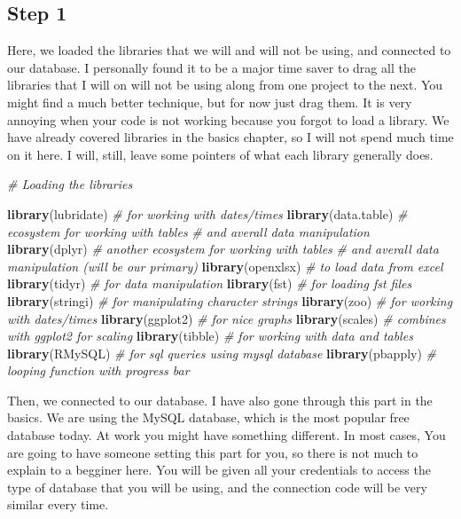 \documentclass[]{book}
\newenvironment{Shaded}{\begin{snugshade}}{\end{snugshade}}
\newcommand{\CommentTok}[1]{\textcolor[rgb]{0.56,0.35,0.01}{\textit{#1}}}
\newcommand{\KeywordTok}[1]{\textcolor[rgb]{0.13,0.29,0.53}{\textbf{#1}}}
\newcommand{\NormalTok}[1]{#1}
\begin{document}
\hypertarget{step-1-1}{%
\subsection{Step 1}\label{step-1-1}}

Here, we loaded the libraries that we will and will not be using, and connected to our database. I personally found it to be a major time saver to drag all the libraries that I will on will not be using along from one project to the next. You might find a much better technique, but for now just drag them. It is very annoying when your code is not working because you forgot to load a library. We have already covered libraries in the basics chapter, so I will not spend much time on it here. I will, still, leave some pointers of what each library generally does.

\begin{Shaded}
\begin{Highlighting}[]
\CommentTok{# Loading the libraries}

  \KeywordTok{library}\NormalTok{(lubridate) }\CommentTok{# for working with dates/times}
  \KeywordTok{library}\NormalTok{(data.table) }\CommentTok{# ecosystem for working with tables}
\CommentTok{# and averall data manipulation}
  \KeywordTok{library}\NormalTok{(dplyr) }\CommentTok{# another ecosystem for working with tables}
\CommentTok{# and averall data manipulation (will be our primary)}
  \KeywordTok{library}\NormalTok{(openxlsx) }\CommentTok{# to load data from excel}
  \KeywordTok{library}\NormalTok{(tidyr) }\CommentTok{# for data manipulation}
  \KeywordTok{library}\NormalTok{(fst) }\CommentTok{# for loading fst files }
  \KeywordTok{library}\NormalTok{(stringi) }\CommentTok{# for manipulating character strings}
  \KeywordTok{library}\NormalTok{(zoo) }\CommentTok{# for working with dates/times}
  \KeywordTok{library}\NormalTok{(ggplot2) }\CommentTok{# for nice graphs}
  \KeywordTok{library}\NormalTok{(scales) }\CommentTok{# combines with ggplot2 for scaling}
  \KeywordTok{library}\NormalTok{(tibble) }\CommentTok{# for working with data and tables}
  \KeywordTok{library}\NormalTok{(RMySQL) }\CommentTok{# for sql queries using mysql database}
  \KeywordTok{library}\NormalTok{(pbapply) }\CommentTok{# looping function with progress bar}
\end{Highlighting}
\end{Shaded}

Then, we connected to our database. I have also gone through this part in the basics. We are using the MySQL database, which is the most popular free database today. At work you might have something different. In most cases, You are going to have someone setting this part for you, so there is not much to explain to a begginer here. You will be given all your credentials to access the type of database that you will be using, and the connection code will be very similar every time.
\end{document}
